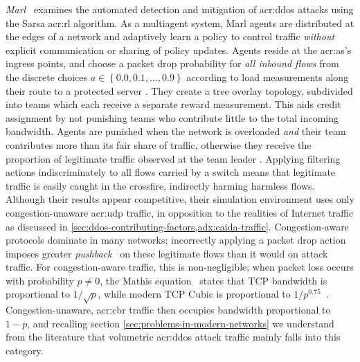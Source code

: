 \emph{Marl}~\parencite{DBLP:conf/iaai/MalialisK13,DBLP:journals/eaai/MalialisK15} examines the automated detection and mitigation of \gls{acr:ddos} attacks using the Sarsa \gls{acr:rl} algorithm.
As a multiagent system, Marl agents are distributed at the edges of a network and adaptively learn a policy to control traffic \emph{without} explicit communication or sharing of policy updates.
Agents reside at the \gls{acr:as}'s ingress points, and choose a packet drop probability for \emph{all inbound flows} from the discrete choices $a\in\left\{0.0,0.1,...,0.9\right\}$ \prllitact{} according to load measurements along their route to a protected server \prllitstate.
They create a tree overlay topology, subdivided into teams which each receive a separate reward measurement.
This aids credit assignment by not punishing teams who contribute little to the total incoming bandwidth.
Agents are punished when the network is overloaded \emph{and} their team contributes more than its fair share of traffic, otherwise they receive the proportion of legitimate traffic observed at the team leader \prllitreward.
Applying filtering actions indiscriminately to all flows carried by a switch means that legitimate traffic is easily caught in the crossfire, indirectly harming harmless flows.
Although their results appear competitive, their simulation environment uses only congestion-unaware \gls{acr:udp} traffic, in opposition to the realities of Internet traffic as discussed in \cref{sec:ddos-contributing-factors,adx:caida-traffic}.
Congestion-aware protocols dominate in many networks; incorrectly applying a packet drop action imposes greater \emph{pushback}~\parencite{DBLP:journals/ccr/MahajanBFIPS02a} on these legitimate flows than it would on attack traffic.
For congestion-aware traffic, this is non-negligible; when packet loss occurs with probability $p\ne0$, the Mathis equation~\parencite{DBLP:journals/ccr/MathisSMO97} states that TCP bandwidth is proportional to $1/\sqrt{p}$, while modern TCP Cubic is proportional to $1/p^{0.75}$~\parencite{rfc8312}.
Congestion-unaware, \gls{acr:cbr} traffic then occupies bandwidth proportional to $1 - p$, and recalling section \cref{sec:problems-in-modern-networks} we understand from the literature that volumetric \gls{acr:ddos} attack traffic mainly falls into this category.

